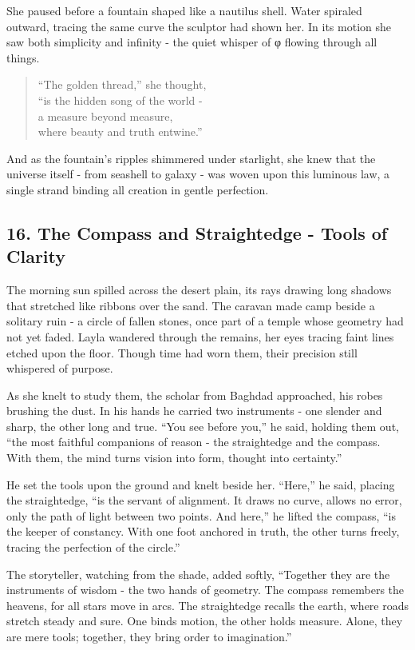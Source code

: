 \documentclass[
  letterpaper,
  DIV=11,
  numbers=noendperiod]{scrreprt}
\begin{document}
She paused before a fountain shaped like a nautilus shell. Water
spiraled outward, tracing the same curve the sculptor had shown her. In
its motion she saw both simplicity and infinity - the quiet whisper of φ
flowing through all things.

\begin{quote}
``The golden thread,'' she thought,\\
``is the hidden song of the world -\\
a measure beyond measure,\\
where beauty and truth entwine.''
\end{quote}

And as the fountain's ripples shimmered under starlight, she knew that
the universe itself - from seashell to galaxy - was woven upon this
luminous law, a single strand binding all creation in gentle perfection.

\subsection{16. The Compass and Straightedge - Tools of
Clarity}\label{the-compass-and-straightedge---tools-of-clarity}

The morning sun spilled across the desert plain, its rays drawing long
shadows that stretched like ribbons over the sand. The caravan made camp
beside a solitary ruin - a circle of fallen stones, once part of a
temple whose geometry had not yet faded. Layla wandered through the
remains, her eyes tracing faint lines etched upon the floor. Though time
had worn them, their precision still whispered of purpose.

As she knelt to study them, the scholar from Baghdad approached, his
robes brushing the dust. In his hands he carried two instruments - one
slender and sharp, the other long and true. ``You see before you,'' he
said, holding them out, ``the most faithful companions of reason - the
straightedge and the compass. With them, the mind turns vision into
form, thought into certainty.''

He set the tools upon the ground and knelt beside her. ``Here,'' he
said, placing the straightedge, ``is the servant of alignment. It draws
no curve, allows no error, only the path of light between two points.
And here,'' he lifted the compass, ``is the keeper of constancy. With
one foot anchored in truth, the other turns freely, tracing the
perfection of the circle.''

The storyteller, watching from the shade, added softly, ``Together they
are the instruments of wisdom - the two hands of geometry. The compass
remembers the heavens, for all stars move in arcs. The straightedge
recalls the earth, where roads stretch steady and sure. One binds
motion, the other holds measure. Alone, they are mere tools; together,
they bring order to imagination.''
\end{document}
